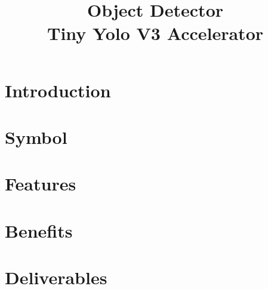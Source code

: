 \documentclass{../../submodules/TEX/document/ug/ug}
\title{Object Detector\\ Tiny Yolo V3 Accelerator}
\begin{document}
\maketitle

\cleardoublepage
\tableofcontents
\listoftables
\listoffigures
\cleardoublepage

\section{Introduction}


\section{Symbol}


\section{\textcolor[rgb]{0,0,0}{Features}}


\section{\textcolor[rgb]{0,0,0}{Benefits}}


\section{\textcolor[rgb]{0,0,0}{Deliverables}}

\end{document}
